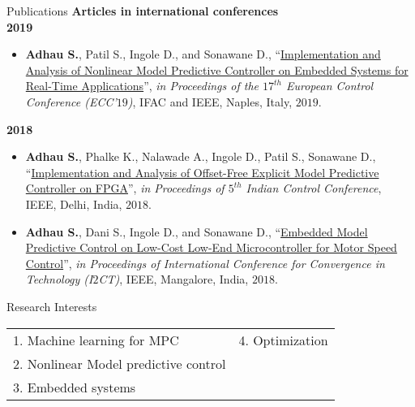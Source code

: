 \documentclass[11pt]{resume}
\newenvironment{outerlist}[1][\enskip\textbullet]%
{\begin{itemize}[#1,leftmargin=*]}{\end{itemize}%
	\vspace{-.5\baselineskip}}
\begin{document}
\begin{rSection}{Publications}
	\textbf{Articles in international conferences}\\
	\textbf{2019}
	\begin{outerlist}
	\item \textbf{Adhau S.}, Patil S., Ingole D., and Sonawane D., ``\href{https://www.researchgate.net/publication/331225239_Implementation_and_Analysis_of_Nonlinear_Model_Predictive_Controller_on_Embedded_Systems_for_Real-Time_Applications}{Implementation and Analysis of Nonlinear Model Predictive Controller on Embedded Systems for Real-Time Applications}'', \textit{in Proceedings of the $ 17^{th} $ European Control Conference (ECC'$19 $)}, IFAC and IEEE, Naples, Italy, $ 2019 $.
	\end{outerlist}

	\textbf{2018}
	\begin{outerlist}
	\item \textbf{Adhau S.}, Phalke K., Nalawade A., Ingole D., Patil S., Sonawane D., ``\href{https://saketadhau.netlify.com/publication/icc/icc.pdf}{Implementation and Analysis of Offset-Free Explicit Model Predictive Controller on FPGA}'', \textit{in Proceedings of $ 5^{th} $ Indian Control Conference}, IEEE, Delhi, India, $ 2018 $.

	\item \textbf{Adhau S.}, Dani S., Ingole D., and Sonawane D., ``\href{https://saketadhau.netlify.com/publication/i2ct/i2ct.pdf}{Embedded Model Predictive Control on Low-Cost Low-End Microcontroller for Motor Speed Control}'', \textit{in Proceedings of International Conference for Convergence in Technology (I$ 2 $CT)}, IEEE, Mangalore, India, $ 2018 $.	
	\end{outerlist}
\end{rSection}	
\vspace{5mm}
\begin{rSection}{Research Interests}
\begin{tabu} to 1\textwidth {  X[l]  X[l]  }
1. Machine learning for MPC & 4. Optimization  \\ 
2. Nonlinear Model predictive control & \\
3. Embedded systems & \\
\end{tabu}
\end{rSection}
\vspace{5mm}
\end{document}
